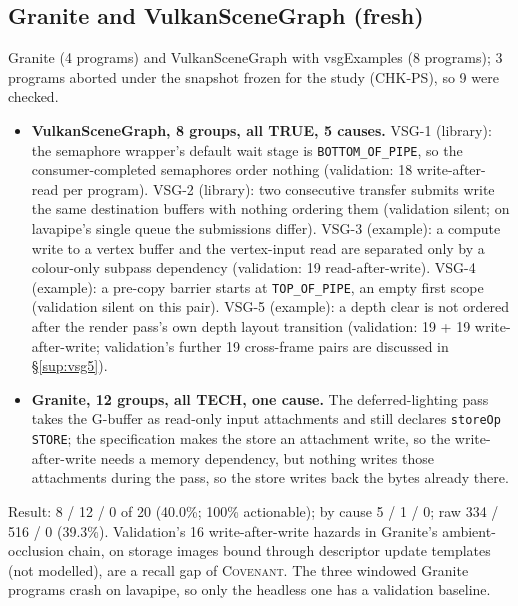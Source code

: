 \documentclass[acmtog,anonymous,review]{acmart}
\newcommand{\sys}{\textsc{Covenant}\xspace}
\newcommand{\code}[1]{\texttt{#1}}
\begin{document}
\subsection{Granite and VulkanSceneGraph (fresh)}
Granite (4 programs) and VulkanSceneGraph with vsgExamples (8 programs); 3 programs
aborted under the snapshot frozen for the study (CHK-PS), so 9 were checked.
\begin{itemize}
\item \textbf{VulkanSceneGraph, 8 groups, all TRUE, 5 causes.} VSG-1 (library): the semaphore wrapper's default wait
  stage is \code{BOTTOM\_OF\_PIPE}, so the consumer-completed semaphores order nothing (validation: 18
  write-after-read per program). VSG-2 (library): two consecutive transfer submits write the same destination buffers
  with nothing ordering them (validation silent; on lavapipe's single queue the submissions differ). VSG-3 (example):
  a compute write to a vertex buffer and the vertex-input read are separated only by a colour-only subpass dependency
  (validation: 19 read-after-write). VSG-4 (example): a pre-copy barrier starts at \code{TOP\_OF\_PIPE}, an empty first
  scope (validation silent on this pair). VSG-5 (example): a depth clear is not ordered after the render pass's own depth
  layout transition (validation: 19 + 19 write-after-write; validation's further 19 cross-frame pairs are discussed in
  \S\ref{sup:vsg5}).
\item \textbf{Granite, 12 groups, all TECH, one cause.} The deferred-lighting pass takes the G-buffer as read-only input
  attachments and still declares \code{storeOp STORE}; the specification makes the store an attachment write, so the
  write-after-write needs a memory dependency, but nothing writes those attachments during the pass, so the store
  writes back the bytes already there.
\end{itemize}
Result: 8 / 12 / 0 of 20 (40.0\%; 100\% actionable); by cause 5 / 1 / 0; raw 334 / 516 / 0 (39.3\%). Validation's 16
write-after-write hazards in Granite's ambient-occlusion chain, on storage images bound through descriptor update
templates (not modelled), are a recall gap of \sys. The three windowed Granite programs crash on lavapipe, so only the
headless one has a validation baseline.
\end{document}
